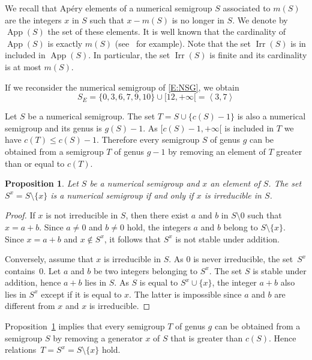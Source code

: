 \documentclass[reqno,11pt]{amsart}
\theoremstyle{plain}
\newtheorem{prop}{Proposition}[section]
\theoremstyle{definition}
\renewcommand{\leq}{\leqslant}
\DeclareMathOperator{\Irr}{Irr}
\DeclareMathOperator{\App}{App}
\begin{document}
We recall that Ap\'ery elements of a numerical semigroup $S$ associated to $m(S)$ are the integers $x$ in $S$ such that $x-m(S)$ is no longer in $S$.
We denote by~$\App(S)$ the set of these elements. 
It is well known that the cardinality of $\App(S)$ is exactly $m(S)$ (see~\cite{Book} for example). 
Note that the set $\Irr(S)$ is in included in $\App(S)$.
In particular, the set $\Irr(S)$ is finite and its cardinality is at most $m(S)$. 


If we reconsider the numerical semigroup of \eqref{E:NSG}, we obtain
\begin{equation}
\label{E:GNSG}
S_E=\{0,3,6,7,9,10\}\cup[12,+\infty[=\left<3,7\right>
\end{equation}

Let  $S$ be a numerical semigroup. The set $T=S\cup\{c(S)-1\}$ is also a numerical  semigroup and its genus is $g(S)-1$. 
As  $[c(S)-1,+\infty[$ is included in $T$ we have $c(T)\leq c(S)-1$. 
Therefore every semigroup $S$ of genus $g$ can be obtained from a semigroup $T$ of genus $g-1$ by removing an element of $T$ greater than or equal to $c(T)$.

\begin{prop}
\label{P:Sx}
Let $S$ be a numerical semigroup and $x$ an element of $S$. The set~$S^x=S\setminus\{x\}$ is a numerical semigroup if and only if $x$ is irreducible in $S$.
\end{prop}

\begin{proof}
If $x$ is not irreducible in  $S$, then there exist $a$ and $b$ in $S\setminus{0}$ such that $x=a+b$. 
Since $a\not=0$ and $b\not=0$ hold, the integers  $a$ and $b$ belong to $S\setminus\{x\}$. 
Since $x=a+b$ and $x\not\in S^x$, it follows that  $S^x$ is not stable under addition. 

Conversely, assume that $x$ is irreducible in  $S$. 
As $0$ is never irreducible, the set~$S^x$ contains~$0$. 
Let $a$ and $b$ be two integers belonging to $S^x$. 
The set $S$ is stable under addition, hence $a+b$ lies in $S$. 
As $S$ is equal to $S^x\cup\{x\}$, the integer $a+b$ also lies in $S^x$ except if it is equal to $x$. 
The latter is impossible since $a$ and $b$ are different from $x$ and $x$ is irreducible.
\end{proof}

Proposition~\ref{P:Sx} implies that every semigroup $T$ of genus $g$ can be obtained from a semigroup $S$ by removing a generator $x$ of $S$ that is greater than $c(S)$.
Hence relations~$T=S^x=S\setminus\{x\}$ hold.
\end{document}
